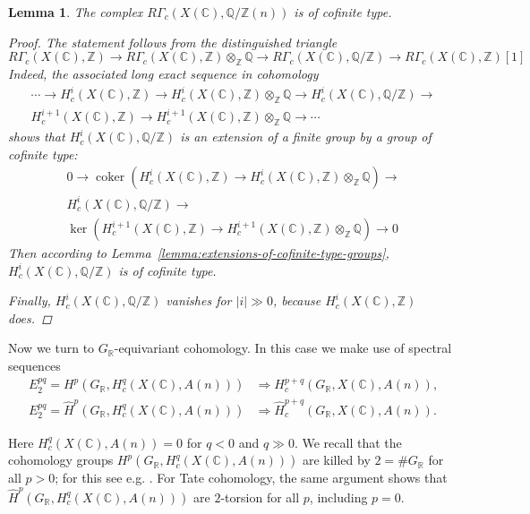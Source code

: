 \documentclass{article}
\DeclareMathOperator{\coker}{coker}
\newcommand{\CC}{\mathbb{C}}
\newcommand{\QQ}{\mathbb{Q}}
\newcommand{\RR}{\mathbb{R}}
\newcommand{\ZZ}{\mathbb{Z}}
\newtheorem{lemma}[theorem]{Lemma}
\theoremstyle{definition}
\numberwithin{equation}{section}
\begin{document}
\begin{lemma}
  The complex $R\Gamma_c (X (\CC), \QQ/\ZZ (n))$ is of cofinite type.

  \begin{proof}
    The statement follows from the distinguished triangle
    \[ R\Gamma_c (X (\CC), \ZZ) \to
    R\Gamma_c (X (\CC), \ZZ)\otimes_\ZZ \QQ \to
    R\Gamma_c (X (\CC), \QQ/\ZZ) \to
    R\Gamma_c (X (\CC), \ZZ) [1] \]
    Indeed, the associated long exact sequence in cohomology
    \begin{multline*}
      \cdots \to H^i_c (X (\CC), \ZZ) \to
      H^i_c (X (\CC), \ZZ)\otimes_\ZZ \QQ \to
      H^i_c (X (\CC), \QQ/\ZZ) \to\\
      H^{i+1}_c (X (\CC), \ZZ) \to
      H^{i+1}_c (X (\CC), \ZZ)\otimes_\ZZ \QQ \to \cdots
    \end{multline*}
    shows that $H^i_c (X (\CC), \QQ/\ZZ)$ is an extension of a finite group by a
    group of cofinite type:
    \begin{multline*}
      0 \to \coker (H^i_c (X (\CC), \ZZ) \to
      H^i_c (X (\CC), \ZZ)\otimes_\ZZ \QQ) \to\\
      H^i_c (X (\CC), \QQ/\ZZ) \to\\
      \ker (H^{i+1}_c (X (\CC), \ZZ) \to
      H^{i+1}_c (X (\CC), \ZZ)\otimes_\ZZ \QQ) \to 0
    \end{multline*}
    Then according to Lemma~\ref{lemma:extensions-of-cofinite-type-groups},
    $H^i_c (X (\CC), \QQ/\ZZ)$ is of cofinite type.

    Finally, $H^i_c (X (\CC), \QQ/\ZZ)$ vanishes for $|i| \gg 0$, because
    $H^i_c (X (\CC), \ZZ)$ does.
  \end{proof}
\end{lemma}

Now we turn to $G_\RR$-equivariant cohomology. In this case we make use of
spectral sequences
\begin{align*}
  E_2^{pq} = H^p (G_\RR, H_c^q (X (\CC), A (n))) & \Longrightarrow H_c^{p+q} (G_\RR, X (\CC), A (n)), \\
  E_2^{pq} = \widehat{H}^p (G_\RR, H_c^q (X (\CC), A (n))) & \Longrightarrow \widehat{H}_c^{p+q} (G_\RR, X (\CC), A (n)).
\end{align*}

Here $H_c^q (X (\CC), A (n)) = 0$ for $q < 0$ and $q \gg 0$. We recall that the
cohomology groups $H^p (G_\RR, H_c^q (X (\CC), A (n)))$ are killed by
$2 = \# G_\RR$ for all $p > 0$; for this see e.g.
\cite[Theorem~6.5.8]{Weibel-1994}. For Tate cohomology, the same argument shows
that $\widehat{H}^p (G_\RR, H_c^q (X (\CC), A (n)))$ are $2$-torsion for all
$p$, including $p = 0$.
\end{document}
